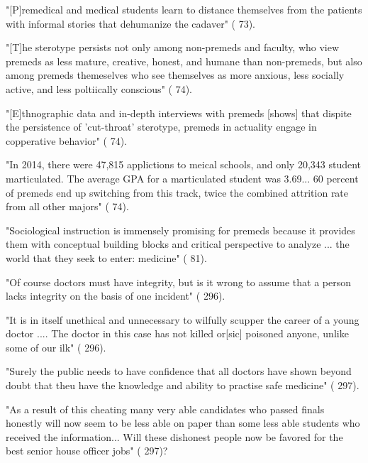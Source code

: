 "[P]remedical and medical students learn to distance themselves from the patients with informal stories that dehumanize the cadaver" (\cite{Olsen-2016} 73).

"[T]he sterotype persists not only among non-premeds and faculty, who view premeds as less mature, creative, honest, and humane than non-premeds, but also among premeds themeselves who see themselves as more anxious, less socially active, and less poltiically conscious" (\cite{Olsen-2016} 74).

"[E]thnographic data and in-depth interviews with premeds [shows] that dispite the persistence of 'cut-throat' sterotype, premeds in actuality engage in copperative behavior" (\cite{Olsen-2016} 74).

"In 2014, there were 47,815 applictions to meical schools, and only 20,343 student marticulated. The average GPA for a marticulated student was 3.69... 60 percent of premeds end up switching from this track, twice the combined attrition rate from all other majors" (\cite{Olsen-2016} 74).

"Sociological instruction is immensely promising for premeds because it provides them with conceptual building blocks and critical perspective to analyze ... the world that they seek to enter: medicine" (\cite{Olsen-2016} 81).


"Of course doctors must have integrity, but is it wrong to assume that a person lacks integrity on the basis of one incident" (\cite{Spencer-2001} 296).

"It is in itself unethical and unnecessary to wilfully scupper the career of a young doctor .... The doctor in this case has not killed or[sic] poisoned anyone, unlike some of our ilk" (\cite{Spencer-2001} 296).

"Surely the public needs to have confidence that all doctors have shown beyond doubt that theu have the knowledge and ability to practise safe medicine" (\cite{Spencer-2001} 297).

"As a result of this cheating many very able candidates who passed finals honestly will now seem to be less able on paper than some less able students who received the information... Will these dishonest people now be favored for the best senior house officer jobs" (\cite{Spencer-2001} 297)?
